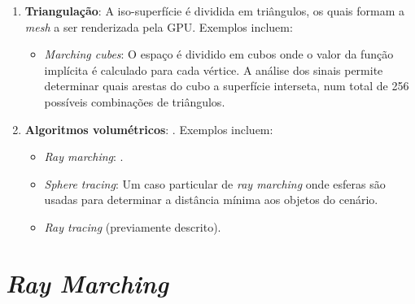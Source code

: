 \begin{enumerate}
	\item \textbf{Triangulação}: A iso-superfície é dividida em triângulos, os quais formam a \textit{mesh} a ser renderizada pela \ac{GPU}. Exemplos incluem:
	\begin{itemize}[nosep]
		\item \textit{Marching cubes}\cite{Lorensen1987}: O espaço é dividido em cubos onde o valor da função implícita é calculado para cada vértice. A análise dos sinais permite determinar quais arestas do cubo a superfície interseta, num total de 256 possíveis combinações de triângulos.
	\end{itemize}
	
	\item \textbf{Algoritmos volumétricos}: . Exemplos incluem:
	\begin{itemize}
		\item \textit{Ray marching}: .
		\item \textit{Sphere tracing}\cite{Hart1996}: Um caso particular de \textit{ray marching} onde esferas são usadas para determinar a distância mínima aos objetos do cenário.
		\item \textit{Ray tracing} (previamente descrito).
	\end{itemize}
\end{enumerate}


\section{\emph{Ray Marching}}
\label{sec::arte:raymarch}



